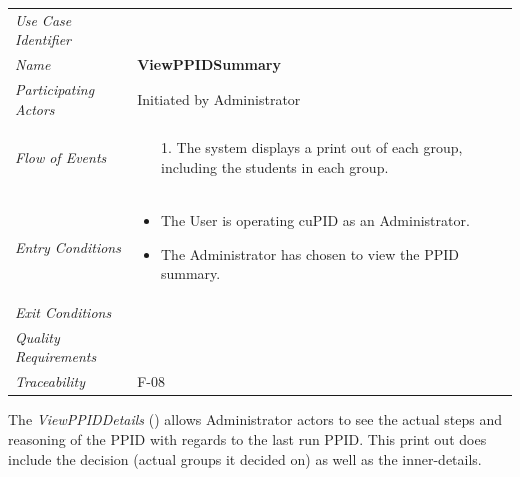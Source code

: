 \documentclass[12pt,letterpaper]{article}
\begin{document}
\begin{center}
	\begin{tabu} to 
		\toprule
		Use Case Identifier &  \\
		Name & {\bf ViewPPIDSummary} \\
		Participating Actors & Initiated by Administrator \\
		Flow of Events & 
		\begin{minipage}[t]{\linewidth}
		    \begin{enumerate}
		        \item[1.] The system displays a print out of each group, including the students in each group.
			\end{enumerate}
	    \end{minipage} \\

		Entry Conditions &
		\begin{minipage}[t]{\linewidth}
			\begin{itemize}
			    \item The User is operating cuPID as an Administrator.
			    \item The Administrator has chosen to view the PPID summary.
	        \end{itemize}
	    \end{minipage} \\

		Exit Conditions & \\

		Quality Requirements & \\

		Traceability & F-08 \\
		\toprule
	\end{tabu}
\end{center}

\vspace{1em}
The {\it ViewPPIDDetails} () allows Administrator actors to see the actual steps and reasoning of the PPID with regards to the last run PPID. This print out does include the decision (actual groups it decided on) as well
as the inner-details.
\end{document}
